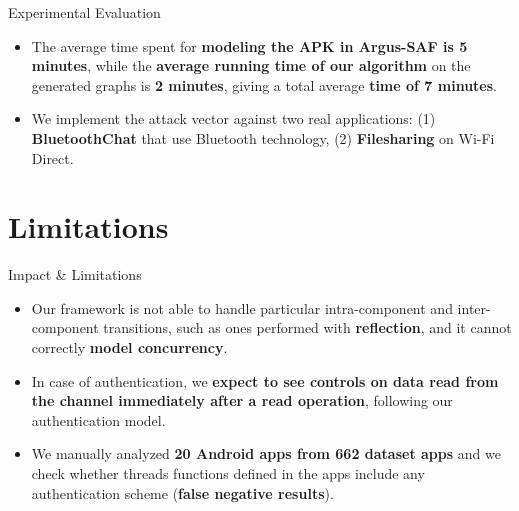 \documentclass[10pt]{beamer}
\begin{document}
\begin{frame}[fragile]{Experimental Evaluation}

  \begin{itemize}

\item The average time spent for {\bf modeling the APK in Argus-SAF is
    5 minutes}, while the {\bf average running time of our algorithm}
  on the generated graphs is {\bf 2 minutes}, giving a total average
  {\bf time of 7 minutes}.
    
  \item We implement the attack vector against two real applications:
    (1) {\bf BluetoothChat} that use Bluetooth technology, (2) {\bf
      Filesharing} on Wi-Fi Direct.

  \end{itemize}
  
  
\end{frame}


\section{Limitations}
\begin{frame}[fragile]{Impact \& Limitations}

\begin{itemize}

\item Our framework is not able to handle particular intra-component
  and inter-component transitions, such as ones performed with {\bf
    reflection}, and it cannot correctly {\bf model concurrency}.

\item In case of authentication, we {\bf expect to see controls on
    data read from the channel immediately after a read operation},
  following our authentication model.

\item We manually analyzed {\bf 20 Android apps from 662 dataset apps}
  and we check whether threads functions defined in the apps include
  any authentication scheme ({\bf false negative results}).

\end{itemize}

\end{frame}
\end{document}
